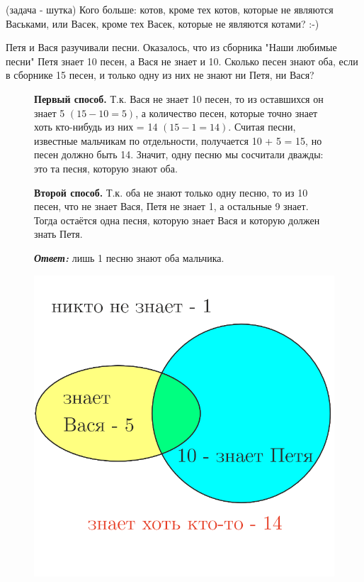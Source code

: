 \begin{thm} (задача - шутка) Кого больше: котов, кроме тех котов, которые не являются Васьками, или Васек, кроме тех Васек, которые не являются котами? \hfill :-)
\end{thm}
\begin{thm}
Петя и Вася разучивали песни. Оказалось, что из сборника "Наши любимые песни" Петя знает 10 песен, а Вася не знает и 10. Сколько песен знают оба, если в сборнике 15 песен, и только одну из них не знают ни Петя, ни Вася?
\end{thm}
{\setlength{\intextsep}{2pt}
\begin{figure}[H]
\begin{minipage}{0.7\linewidth}\setlength{\parindent}{1.5em}
\begin{prf}
\par
\textbf{Первый способ.}
Т.к. Вася не знает 10 песен, то из оставшихся он знает 5 $(15 - 10 = 5)$, а количество песен, которые точно знает хоть кто-нибудь из них  = 14 $(15 - 1 = 14)$. Считая песни, известные мальчикам по отдельности, получается 10 + 5 = 15, но песен должно быть 14. Значит, одну песню мы сосчитали дважды: это та песня, которую знают оба.
\par
\textbf{Второй способ.} Т.к. оба не знают только одну песню, то из 10 песен, что не знает Вася, Петя не знает 1, а остальные 9 знает. Тогда остаётся одна песня, которую знает Вася и которую должен знать Петя.
\par
\textbf{\textit{Ответ:}} лишь 1 песню знают оба мальчика.
\end{prf}
\end{minipage}
\hfill
\begin{minipage}{0.29\linewidth}
    \includegraphics[width=0.9\columnwidth]{./img/Petr}
\end{minipage}
\end{figure}}

